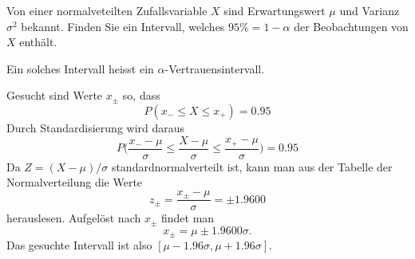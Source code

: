 Von einer normalveteilten Zufallsvariable $X$ sind Erwartungswert $\mu$
und Varianz $\sigma^2$ bekannt. Finden Sie ein Intervall, welches
$95\%=1-\alpha$ der Beobachtungen von $X$ enthält.

Ein solches Intervall heisst ein $\alpha$-Vertrauensintervall.


\begin{loesung}
Gesucht sind Werte $x_\pm$ so, dass 
\[
P(x_-\le X\le x_+)=0.95
\]
Durch Standardisierung wird daraus
\[
P\biggl(\frac{x_--\mu}{\sigma}\le \frac{X-\mu}{\sigma} \le \frac{x_+-\mu}{\sigma}\biggr)
=0.95
\]
Da $Z=(X-\mu)/\sigma$ standardnormalverteilt ist, kann man aus der
Tabelle der Normalverteilung die Werte
\[
z_\pm=\frac{x_\pm -\mu}{\sigma}=\pm1.9600
\]
herauslesen. Aufgelöst nach $x_\pm$ findet man
\[
x_\pm = \mu\pm1.9600\sigma.
\]
Das gesuchte Intervall ist also $[\mu-1.96\sigma,\mu+1.96\sigma]$.
\end{loesung}

